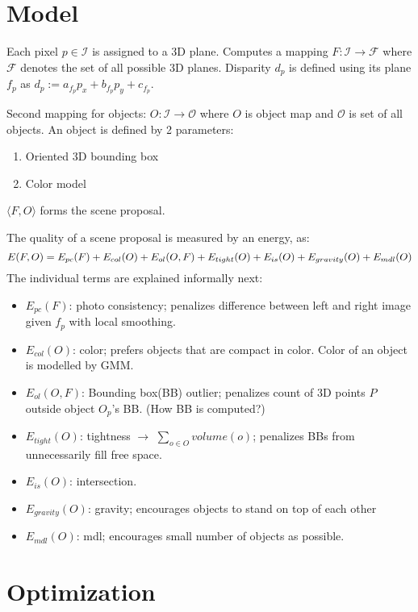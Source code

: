 \documentclass[a4paper,12pt]{article}
\begin{document}
\section{Model}
Each pixel $p \in \mathcal{I}$ is assigned to a 3D plane. Computes a mapping $F: \mathcal{I} \rightarrow \mathcal{F}$ where $\mathcal{F}$ denotes the set of all possible 3D planes. Disparity $d_p$ is defined using its plane $f_p$ as $d_p := a_{f_p}p_x+b_{f_p}p_y + c_{f_p}$. 

Second mapping for objects: $O: \mathcal{I} \rightarrow \mathcal{O}$ where $O$ is object map and $\mathcal{O}$ is 
set of all objects. An object is defined by 2 parameters:
\begin{enumerate}
\item Oriented 3D bounding box
\item Color model
\end{enumerate}
$\langle F,O\rangle$ forms the scene proposal.

The quality of a scene proposal is measured by an energy, as:
\begin{equation}
E(F,O) = E_{pc}(F) + E_{col}(O) + E_{ol}(O,F) +\\
E_{tight}(O) + E_{is}(O) + E_{gravity}(O)+E_{mdl}(O)
\end{equation}
The individual terms are explained informally next:
\begin{itemize}
\item $E_{pc}(F)$: photo consistency; penalizes difference between left and right image given $f_p$ with local smoothing.
\item $E_{col}(O)$: color; prefers objects that are compact in color. Color of an object is modelled by GMM.
\item $E_{ol}(O,F)$: Bounding box(BB) outlier; penalizes count of 3D points $P$ outside object $O_p$'s BB. (How BB is computed?)
\item $E_{tight}(O)$: tightness $\rightarrow$ $\sum_{o \in O} volume(o)$; penalizes BBs from unnecessarily fill free space.
\item $E_{is}(O)$: intersection.
\item $E_{gravity}(O)$: gravity; encourages objects to stand on top of each other
\item $E_{mdl}(O)$: mdl; encourages small number of objects as possible.
\end{itemize}

\section{Optimization}
\end{document}
